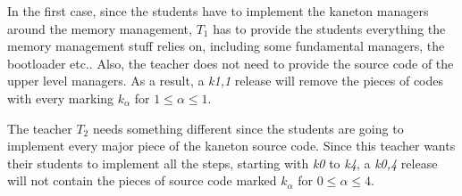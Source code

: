In the first case, since the students have to implement the kaneton managers
around the memory management, $T_{1}$ has to provide the students everything
the memory management stuff relies on, including some fundamental managers,
the bootloader etc.. Also, the teacher does not need to provide the source
code of the upper level managers. As a result, a \textit{k1,1} release will
remove the pieces of codes with every marking $k_{\alpha}$ for
$1 \le \alpha \le 1$.

The teacher $T_{2}$ needs something different since the students are going
to implement every major piece of the kaneton source code. Since this teacher
wants their students to implement all the steps, starting with \textit{k0}
to \textit{k4}, a \textit{k0,4} release will not contain the pieces of source
code marked $k_{\alpha}$ for $0 \le \alpha \le 4$.
